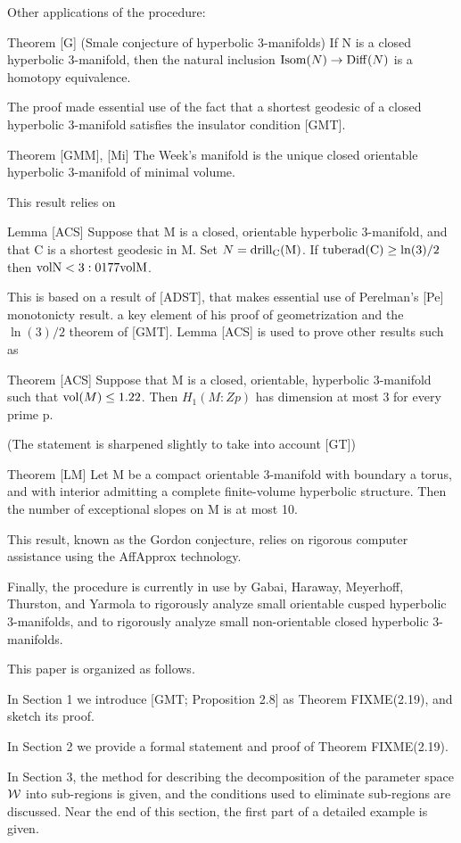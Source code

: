 Other applications of the procedure:

Theorem [G]  (Smale conjecture of hyperbolic 3-manifolds)
If N is a closed hyperbolic 3-manifold,
then the natural inclusion ${\rm Isom}(N)\to {\rm Diff}(N)$ is a homotopy equivalence.

The proof made essential use of the fact that a shortest geodesic
of a closed hyperbolic 3-manifold satisfies the insulator condition [GMT].

Theorem [GMM], [Mi] The Week's manifold
is the unique closed orientable hyperbolic 3-manifold of minimal volume.

This result relies on 

Lemma [ACS] Suppose that M is a closed, orientable hyperbolic 3-manifold,
and that C is a shortest geodesic in M.
Set $N = \rm{drill}_C(M)$. If $\rm{tuberad}(C) \ge \ln(3)/2$ then
$\rm{vol} N < 3:0177 \rm{vol}M$.

This is based on a result of [ADST],
that makes essential use of Perelman's [Pe] monotonicty result.
a key element of his proof of geometrization and the $\ln(3)/2$
theorem of [GMT].
Lemma [ACS] is used to prove other results such as 

Theorem [ACS] Suppose that M is a closed, orientable, hyperbolic
3-manifold such that ${\rm vol}(M) \le 1.22$.
Then $H_1(M:Zp)$ has dimension at most 3 for every prime p.

(The statement is sharpened slightly to take into account [GT])

Theorem [LM] Let M be a compact orientable 3-manifold with boundary a torus,
and with interior admitting a complete finite-volume hyperbolic structure.
Then the number of exceptional slopes on M is at most 10.

This result, known as the Gordon conjecture,
relies on rigorous computer assistance using the AffApprox technology.

Finally, the procedure is currently in use
by Gabai, Haraway, Meyerhoff, Thurston, and Yarmola
to rigorously analyze small orientable cusped hyperbolic $3$-manifolds,
and to rigorously analyze small non-orientable closed hyperbolic $3$-manifolds.


This paper is organized as follows.

In Section 1 we introduce [GMT; Proposition 2.8] as Theorem FIXME(2.19),
and sketch its proof.

In Section 2 we provide a formal statement and proof of Theorem FIXME(2.19).

In Section 3,
the method for describing the decomposition
of the parameter space ${\cal W}$ into sub-regions is given,
and the conditions used to eliminate sub-regions are discussed.
Near the end of this section, the first part of a detailed example is given.

